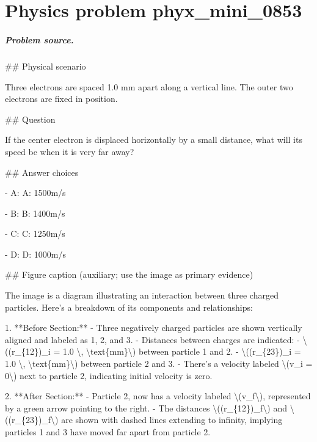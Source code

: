 
\chapter{Physics problem phyx\_mini\_0853}
\label{ch:PhyXMiniProblems_problem_phyx_mini_0853}

\paragraph{Problem source.}
\#\# Physical scenario

Three electrons are spaced 1.0 mm apart along a vertical line. The outer two electrons are fixed in position.

\#\# Question

If the center electron is displaced horizontally by a small distance, what will its speed be when it is very far away?

\#\# Answer choices

- A: A: 1500m/s

- B: B: 1400m/s

- C: C: 1250m/s

- D: D: 1000m/s

\#\# Figure caption (auxiliary; use the image as primary evidence)

The image is a diagram illustrating an interaction between three charged particles. Here's a breakdown of its components and relationships:

1. **Before Section:**
   - Three negatively charged particles are shown vertically aligned and labeled as 1, 2, and 3.
   - Distances between charges are indicated:
     - \textbackslash{}((r\_\{12\})\_i = 1.0 \textbackslash{}, \textbackslash{}text\{mm\}\textbackslash{}) between particle 1 and 2.
     - \textbackslash{}((r\_\{23\})\_i = 1.0 \textbackslash{}, \textbackslash{}text\{mm\}\textbackslash{}) between particle 2 and 3.
   - There's a velocity labeled \textbackslash{}(v\_i = 0\textbackslash{}) next to particle 2, indicating initial velocity is zero.

2. **After Section:**
   - Particle 2, now has a velocity labeled \textbackslash{}(v\_f\textbackslash{}), represented by a green arrow pointing to the right.
   - The distances \textbackslash{}((r\_\{12\})\_f\textbackslash{}) and \textbackslash{}((r\_\{23\})\_f\textbackslash{}) are shown with dashed lines extending to infinity, implying particles 1 and 3 have moved far apart from particle 2.

